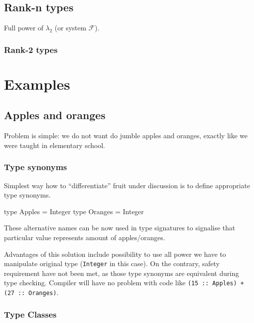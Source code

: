 \documentclass[11pt,oneside,draft]{fithesis2}
\newcommand\uv[1]{``#1''}
\theoremstyle{definition}
\begin{document}
\cite{GADT+Kind=Dep}

\section{Rank-n types}
\label{extension:rankn}

Full power of \(\lambda_2\) (or system \(\mathcal{F}\)).

\subsection{Rank-2 types}


\chapter{Examples}

\section{Apples and oranges}

Problem is simple: we do not want do jumble apples and oranges,
exactly like we were taught in elementary school.

\subsection{Type synonyms}

Simplest way how to \uv{differentiate} fruit under discussion is to define
appropriate type synonyms.
\begin{code}
type Apples  = Integer
type Oranges = Integer
\end{code}
These alternative names can be now used in type signatures to signalise that
particular value represents amount of apples/oranges.

Advantages of this solution include possibility to use all power we have
to manipulate original type (\texttt{Integer} in this case). On the contrary,
safety requirement have not been met, as those type synonyms are equivalent
during type checking. Compiler will have no problem with
code like \texttt{(15 :: Apples) + (27 :: Oranges)}.

\subsection{Type Classes}
\end{document}
